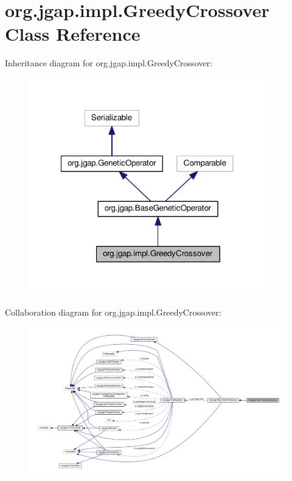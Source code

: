 \hypertarget{classorg_1_1jgap_1_1impl_1_1_greedy_crossover}{\section{org.\-jgap.\-impl.\-Greedy\-Crossover Class Reference}
\label{classorg_1_1jgap_1_1impl_1_1_greedy_crossover}
}


Inheritance diagram for org.\-jgap.\-impl.\-Greedy\-Crossover\-:
\nopagebreak
\begin{figure}[H]
\begin{center}
\leavevmode
\includegraphics[width=291pt]{classorg_1_1jgap_1_1impl_1_1_greedy_crossover__inherit__graph}
\end{center}
\end{figure}


Collaboration diagram for org.\-jgap.\-impl.\-Greedy\-Crossover\-:
\nopagebreak
\begin{figure}[H]
\begin{center}
\leavevmode
\includegraphics[width=350pt]{classorg_1_1jgap_1_1impl_1_1_greedy_crossover__coll__graph}
\end{center}
\end{figure}
